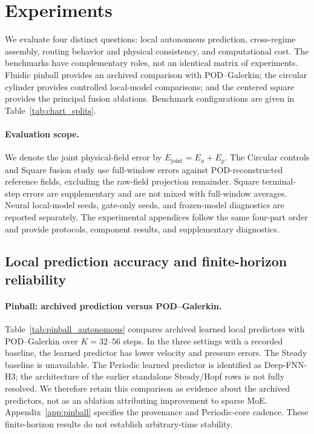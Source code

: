 \section{Experiments}
\label{sec:experiments}

We evaluate four distinct questions: local autonomous prediction,
cross-regime assembly, routing behavior and physical consistency,
and computational cost. The benchmarks have complementary roles,
not an identical matrix of experiments. Fluidic pinball provides an
archived comparison with POD--Galerkin; the circular cylinder provides
controlled local-model comparisons; and the centered square provides
the principal fusion ablations. Benchmark configurations are given in
Table~\ref{tab:chart_splits}.

\paragraph{Evaluation scope.}
We denote the joint physical-field error by $E_{\mathrm{joint}}=E_u+E_p$.
The Circular controls and Square fusion study use full-window errors
against POD-reconstructed reference fields, excluding the raw-field
projection remainder. Square terminal-step errors are supplementary
and are not mixed with full-window averages. Neural local-model seeds,
gate-only seeds, and frozen-model diagnostics are reported separately.
The experimental appendices follow the same four-part order and provide
protocols, component results, and supplementary diagnostics.



\subsection{Local prediction accuracy and finite-horizon reliability}
\label{sec:exp_local}

\paragraph{Pinball: archived prediction versus POD--Galerkin.}
Table~\ref{tab:pinball_autonomous} compares archived learned local
predictors with POD--Galerkin over $K=32$--$56$ steps. In the three
settings with a recorded baseline, the learned predictor has lower
velocity and pressure errors. The Steady baseline is unavailable.
The Periodic learned predictor is identified as Deep-FNN-H3; the
architecture of the earlier standalone Steady/Hopf rows is not fully
resolved. We therefore retain this comparison as evidence about the
archived predictors, not as an ablation attributing improvement to
sparse MoE. Appendix~\ref{app:pinball} specifies the provenance and
Periodic-core cadence. These finite-horizon results do not establish
arbitrary-time stability.



